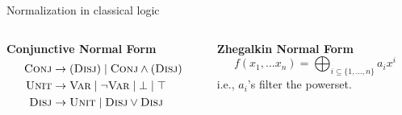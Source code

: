 \documentclass{beamer}
\begin{document}
    \begin{frame}{Normalization in classical logic}
        \begin{columns}[t]
            \begin{column}{0.55\textwidth}
                \begin{center}
                    \textbf{Conjunctive Normal Form}
                    \phantom{()}\\
                    \begin{align*}
                        \textsc{Conj} &\rightarrow (\textsc{Disj}) \mid \textsc{Conj} \land (\textsc{Disj})\\
                        \textsc{Unit} &\rightarrow \textsc{Var} \mid \neg \textsc{Var} \mid \bot \mid \top \\
                        \textsc{Disj} &\rightarrow \textsc{Unit} \mid \textsc{Disj} \vee \textsc{Disj}
                    \end{align*}
                    \begin{prooftree}
                    \end{prooftree}\\
                    \phantom{()}\\
                    \phantom{Solved with SAT (e.g., DPLL/CDCL/Survey Prop).}\\
                \end{center}
            \end{column}
            \begin{column}{0.45\textwidth}
                \begin{center}
                    \textbf{Zhegalkin Normal Form}
                    \phantom{()}\\
                    \[
                        f(x_1, \ldots x_n) = \bigoplus_{i\subseteq\{1,\ldots, n\}}a_i x^i
                    \]
                    i.e., $a_i$'s filter the powerset.
                    \phantom{()}\\
                    \begin{prooftree}

\end{prooftree}
\end{center}
\end{column}
\end{columns}
\end{frame}
\end{document}
